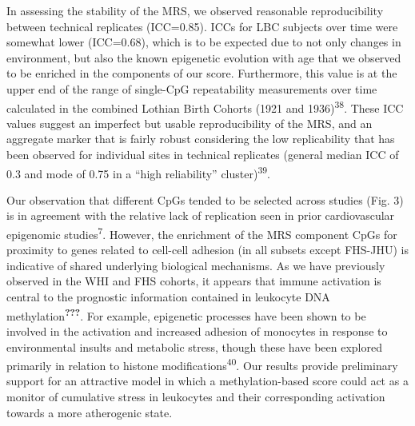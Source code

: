 \documentclass[]{article}
\begin{document}
In assessing the stability of the MRS, we observed reasonable
reproducibility between technical replicates (ICC=0.85). ICCs for LBC
subjects over time were somewhat lower (ICC=0.68), which is to be
expected due to not only changes in environment, but also the known
epigenetic evolution with age that we observed to be enriched in the
components of our score. Furthermore, this value is at the upper end of
the range of single-CpG repeatability measurements over time calculated
in the combined Lothian Birth Cohorts (1921 and
1936)\textsuperscript{38}. These ICC values suggest an imperfect but
usable reproducibility of the MRS, and an aggregate marker that is
fairly robust considering the low replicability that has been observed
for individual sites in technical replicates (general median ICC of 0.3
and mode of 0.75 in a ``high reliability'' cluster)\textsuperscript{39}.

Our observation that different CpGs tended to be selected across studies
(Fig. 3) is in agreement with the relative lack of replication seen in
prior cardiovascular epigenomic studies\textsuperscript{7}. However, the
enrichment of the MRS component CpGs for proximity to genes related to
cell-cell adhesion (in all subsets except FHS-JHU) is indicative of
shared underlying biological mechanisms. As we have previously observed
in the WHI and FHS cohorts, it appears that immune activation is central
to the prognostic information contained in leukocyte DNA
methylation\textsuperscript{{\textbf{???}}}. For example, epigenetic
processes have been shown to be involved in the activation and increased
adhesion of monocytes in response to environmental insults and metabolic
stress, though these have been explored primarily in relation to histone
modifications\textsuperscript{40}. Our results provide preliminary
support for an attractive model in which a methylation-based score could
act as a monitor of cumulative stress in leukocytes and their
corresponding activation towards a more atherogenic state.
\end{document}
